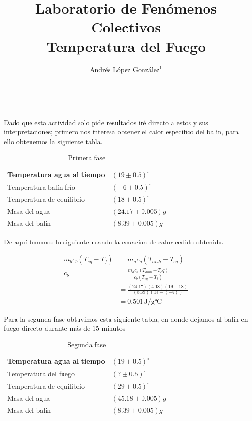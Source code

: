 \documentclass[article,12pt]{elsarticle}
\begin{document}
\begin{frontmatter}
    \title{Laboratorio de Fenómenos Colectivos \\ Temperatura del Fuego} \\
    \author{Andrés López González$^1$} %
    \address{$^1$ Facultad de Ciencias, Universidad Nacional Autónoma de México, M\'exico CDMX.}
\end{frontmatter}

Dado que esta actividad solo pide resultados iré directo a estos y sus interpretaciones; primero nos interesa obtener el calor específico del balín, para ello obtenemos la siguiente tabla.

\begin{table}[h]
\centering
\begin{tabular}{|l|l|}
\hline
Temperatura agua al tiempo & $(19 \pm 0.5)^{\circ}$ \\ \hline
Temperatura balín frío     & $(-6 \pm 0.5)^{\circ}$ \\ \hline
Temperatura de equilibrio  & $(18 \pm 0.5)^{\circ}$ \\ \hline
Masa del agua              & $(24.17 \pm 0.005)g$   \\ \hline
Masa del balín             & $(8.39 \pm 0.005)g$    \\ \hline
\end{tabular}
\caption{Primera fase}
\end{table}

De aquí tenemos lo siguiente usando la ecuación de calor cedido-obtenido.

\begin{align*}
    m_bc_b(T_{eq}-T_f) &= m_ac_a(T_{amb}-T_{eq}) \\
    c_b &= \frac{m_ac_a(T_{amb}-T_eq)}{c_b(T_{eq}-T_f)} \\
    &= \frac{(24.17)(4.18)(19 - 18)}{(8.39)(18 - (-6))} \\
    &= 0.501 \, \text{J/g°C}
\end{align*}

Para la segunda fase obtuvimos esta siguiente tabla, en donde dejamos al balín en fuego directo durante más de 15 minutos

\begin{table}[h]
\centering
\begin{tabular}{|l|l|}
\hline
Temperatura agua al tiempo & $(19 \pm 0.5)^{\circ}$ \\ \hline
Temperatura del fuego     & $(? \pm 0.5)^{\circ}$ \\ \hline
Temperatura de equilibrio  & $(29 \pm 0.5)^{\circ}$ \\ \hline
Masa del agua              & $(45.18 \pm 0.005)g$   \\ \hline
Masa del balín             & $(8.39 \pm 0.005)g$    \\ \hline
\end{tabular}
\caption{Segunda fase}
\end{table}
\end{document}
